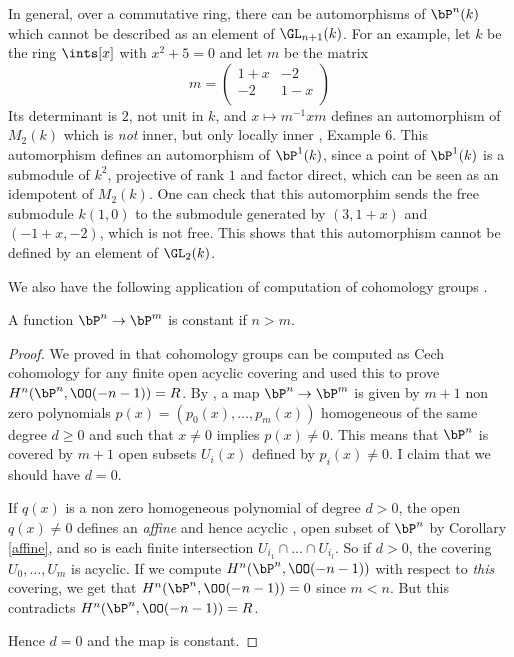  In general, over a commutative ring,
there can be automorphisms of $\bP^n(k)$ which cannot be described as an element of $\GL_{n+1}(k)$.
For an example, let $k$ be the ring $\ints[x]$ with $x^2+5=0$ and let $m$ be the matrix
\[
m =
\begin{pmatrix}
  1+x & -2 \\
  -2 & 1-x \\
\end{pmatrix}  
\]
Its determinant is $2$, not unit in $k$, and $x\mapsto m^{-1}xm$ defines an automorphism of $M_2(k)$
which is {\em not} inner, but only locally inner \cite{Isaacs}, Example 6. This automorphism defines an
automorphism of $\bP^1(k)$, since a point of $\bP^1(k)$ is a submodule of $k^2$, projective of rank $1$ and factor direct,
which can be seen as an idempotent of $M_2(k)$. One can check that
this automorphim sends the free submodule $k(1,0)$ to the submodule generated by $(3,1+x)$ and $(-1+x,-2)$,
which is not free. This shows that this automorphism cannot be defined by an element of $\GL_2(k)$.

\medskip

We also have the following application of computation of cohomology groups \cite{draft}.

\begin{corollary}
A function $\bP^n\rightarrow\bP^m$ is constant if $n>m$.
\end{corollary}

\begin{proof}
We proved in \cite{cech-draft} that cohomology groups can be computed as Cech cohomology for any
finite open acyclic covering and used this to prove $H^n(\bP^n,\OO(-n-1))=R$.
By , a map $\bP^n\rightarrow\bP^m$ is given by $m+1$ non zero polynomials
$p(x) = (p_0(x),\dots,p_m(x))$ homogeneous of the same degree $d\geqslant 0$ and such that $x\neq 0$ implies $p(x)\neq 0$.
This means that $\bP^n$ is covered by $m+1$ open subsets $U_i(x)$ defined by $p_i(x)\neq 0$.
I claim that we should have $d=0$.

 If $q(x)$ is a non zero homogeneous polynomial of degree $d>0$, the open $q(x)\neq 0$ defines an {\em affine}
 and hence acyclic \cite{cech-draft}, open subset of $\bP^n$ by Corollary \ref{affine}, and so is each finite
 intersection $U_{i_1}\cap\dots\cap U_{i_l}$. So if $d>0$, the covering $U_0,\dots,U_m$ is acyclic.
 If we compute $H^n(\bP^n,\OO(-n-1))$ with respect to {\em this} covering, we get that
 $H^n(\bP^n,\OO(-n-1)) = 0$ since $m<n$. But this contradicts $H^n(\bP^n,\OO(-n-1))=R$.

 Hence $d=0$ and the map is constant.
\end{proof}

